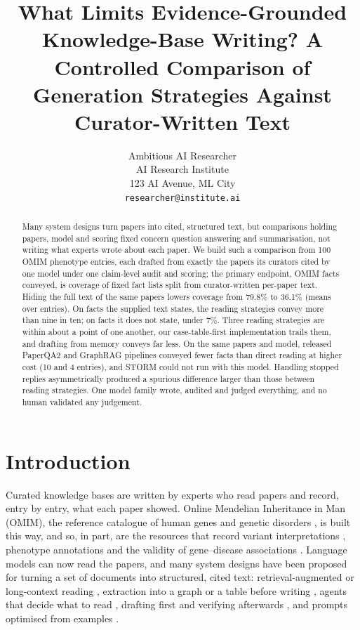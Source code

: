 \documentclass{article} %
\title{What Limits Evidence-Grounded Knowledge-Base Writing? A Controlled Comparison of Generation Strategies Against Curator-Written Text}
\author{Ambitious AI Researcher\\
AI Research Institute\\
123 AI Avenue, ML City\\
\texttt{researcher@institute.ai}
}
\begin{document}
\maketitle


\begin{abstract}
Many system designs turn papers into cited, structured text, but comparisons holding papers, model and scoring fixed concern question answering and summarisation, not writing what experts wrote about each paper. We build such a comparison from 100 OMIM phenotype entries, each drafted from exactly the papers its curators cited by one model under one claim-level audit and scoring; the primary endpoint, OMIM facts conveyed, is coverage of fixed fact lists split from curator-written per-paper text. Hiding the full text of the same papers lowers coverage from 79.8\% to 36.1\% (means over entries). On facts the supplied text states, the reading strategies convey more than nine in ten; on facts it does not state, under 7\%. Three reading strategies are within about a point of one another, our case-table-first implementation trails them, and drafting from memory conveys far less. On the same papers and model, released PaperQA2 and GraphRAG pipelines conveyed fewer facts than direct reading at higher cost (10 and 4 entries), and STORM could not run with this model. Handling stopped replies asymmetrically produced a spurious difference larger than those between reading strategies. One model family wrote, audited and judged everything, and no human validated any judgement.
\end{abstract}

\section{Introduction}
\label{sec:intro}
Curated knowledge bases are written by experts who read papers and record, entry by entry, what each paper showed. Online Mendelian Inheritance in Man (OMIM), the reference catalogue of human genes and genetic disorders \citep{Amberger2014OmimorgOnline,amberger2019omim,hamosh2021online}, is built this way, and so, in part, are the resources that record variant interpretations \citep{Landrum2017ClinvarImproving,landrum2025clinvar}, phenotype annotations \citep{robinson2008human,gargano2024human} and the validity of gene--disease associations \citep{strande2017evaluating}. Language models can now read the papers, and many system designs have been proposed for turning a set of documents into structured, cited text: retrieval-augmented or long-context reading \citep{Lewis2020RetrievalaugmentedGeneration,li2024retrieval}, extraction into a graph or a table before writing \citep{edge2024local,joshi2026sliders}, agents that decide what to read \citep{Nakano2021WebgptBrowserassisted,Lla2023PaperqaRetrievalaugmented,skarlinski2024language}, drafting first and verifying afterwards \citep{Gao2022RarrResearching,dhuliawala2024chainofverification}, and prompts optimised from examples \citep{Khattab2023DspyCompiling,agrawal2026gepa}.
\end{document}
